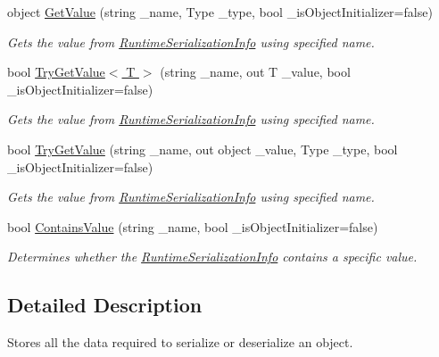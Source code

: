 \begin{DoxyCompactItemize}
object \hyperlink{class_voxel_busters_1_1_runtime_serialization_1_1_runtime_serialization_info_afa5472bda7c1cd80f4150b92a786a810}{Get\+Value} (string \+\_\+name, Type \+\_\+type, bool \+\_\+is\+Object\+Initializer=false)
\begin{DoxyCompactList}\small\item\em Gets the value from \hyperlink{class_voxel_busters_1_1_runtime_serialization_1_1_runtime_serialization_info}{Runtime\+Serialization\+Info} using specified name. \end{DoxyCompactList}\item 
bool \hyperlink{class_voxel_busters_1_1_runtime_serialization_1_1_runtime_serialization_info_a8f6f8bcd13d3ecaad5ba8dc85f4dfcda}{Try\+Get\+Value$<$ T $>$} (string \+\_\+name, out T \+\_\+value, bool \+\_\+is\+Object\+Initializer=false)
\begin{DoxyCompactList}\small\item\em Gets the value from \hyperlink{class_voxel_busters_1_1_runtime_serialization_1_1_runtime_serialization_info}{Runtime\+Serialization\+Info} using specified name. \end{DoxyCompactList}\item 
bool \hyperlink{class_voxel_busters_1_1_runtime_serialization_1_1_runtime_serialization_info_aae1c7a92bad7239f92897ac999026122}{Try\+Get\+Value} (string \+\_\+name, out object \+\_\+value, Type \+\_\+type, bool \+\_\+is\+Object\+Initializer=false)
\begin{DoxyCompactList}\small\item\em Gets the value from \hyperlink{class_voxel_busters_1_1_runtime_serialization_1_1_runtime_serialization_info}{Runtime\+Serialization\+Info} using specified name. \end{DoxyCompactList}\item 
bool \hyperlink{class_voxel_busters_1_1_runtime_serialization_1_1_runtime_serialization_info_ae1e552a892e7fa0cd5aea44277bef990}{Contains\+Value} (string \+\_\+name, bool \+\_\+is\+Object\+Initializer=false)
\begin{DoxyCompactList}\small\item\em Determines whether the \hyperlink{class_voxel_busters_1_1_runtime_serialization_1_1_runtime_serialization_info}{Runtime\+Serialization\+Info} contains a specific value. \end{DoxyCompactList}\end{DoxyCompactItemize}


\subsection{Detailed Description}
Stores all the data required to serialize or deserialize an object. 



